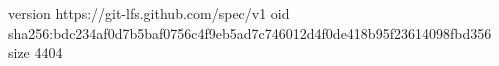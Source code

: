 version https://git-lfs.github.com/spec/v1
oid sha256:bdc234af0d7b5baf0756c4f9eb5ad7c746012d4f0de418b95f23614098fbd356
size 4404
